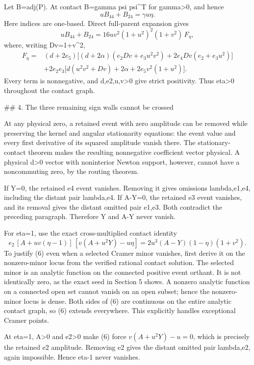Let B=adj(P). At contact B=gamma psi psi^T for gamma>0, and hence
\[
u B_{44}+B_{24}=\gamma u\eta.
\]
Here indices are one-based. Direct full-parent expansion gives
\[
u B_{44}+B_{24}=16uv^2(1+u^2)^2(1+v^2)\,F_\eta,
\tag{4}
\]
where, writing Dv=1+v^2,
\[
\begin{aligned}
F_\eta={}&(d+2e_5)\big[(d+2\alpha)(e_2Dv+e_3u^2v^2)
                 +2e_4Dv(e_2+e_3u^2)\big]\\
&+2e_2e_3\big[d(u^2v^2+Dv)+2\alpha+2e_5v^2(1+u^2)\big].
\end{aligned}
\tag{5}
\]
Every term is nonnegative, and d,e2,u,v>0 give strict positivity.
Thus eta>0 throughout the contact graph.

## 4. The three remaining sign walls cannot be crossed

At any physical zero, a retained event with zero amplitude can be removed
while preserving the kernel and angular stationarity equations: the event
value and every first derivative of its squared amplitude vanish there.
The stationary-contact theorem makes the resulting nonnegative coefficient
vector physical. A physical d>0 vector with noninterior Newton support,
however, cannot have a noncommuting zero, by the routing theorem.

If Y=0, the retained e4 event vanishes. Removing it gives omissions
lambda,e1,e4, including the distant pair lambda,e4. If A-Y=0, the retained
e3 event vanishes, and its removal gives the distant omitted pair e1,e3.
Both contradict the preceding paragraph. Therefore Y and A-Y never vanish.

For eta=1, use the exact cross-multiplied contact identity
\[
e_2\,[A+uv(\eta-1)]\,[v(A+u^2Y)-u\eta]
=2u^3(A-Y)(1-\eta)(1+v^2).
\tag{6}
\]
To justify (6) even when a selected Cramer minor vanishes, first derive it
on the nonzero-minor locus from the verified rational contact solution.
The selected minor is an analytic function on the connected positive event
orthant. It is not identically zero, as the exact seed in Section 5 shows.
A nonzero analytic function on a connected open set cannot vanish on an
open subset; hence the nonzero-minor locus is dense. Both sides of (6) are
continuous on the entire analytic contact graph, so (6) extends everywhere.
This explicitly handles exceptional Cramer points.

At eta=1, A>0 and e2>0 make (6) force
\(v(A+u^2Y)-u=0\), which is precisely the retained e2 amplitude. Removing
e2 gives the distant omitted pair lambda,e2, again impossible. Hence eta-1
never vanishes.

